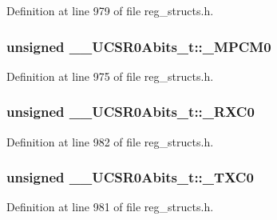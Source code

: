 Definition at line 979 of file reg\+\_\+structs.\+h.

\hypertarget{union_____u_c_s_r0_abits__t_a257c2408b53c4c822a3603e786e2d281}{
\subsubsection[{\+\_\+\+M\+P\+C\+M0}]{\setlength{\rightskip}{0pt plus 5cm}unsigned \+\_\+\+\_\+\+U\+C\+S\+R0\+Abits\+\_\+t\+::\+\_\+\+M\+P\+C\+M0}}\label{union_____u_c_s_r0_abits__t_a257c2408b53c4c822a3603e786e2d281}


Definition at line 975 of file reg\+\_\+structs.\+h.

\hypertarget{union_____u_c_s_r0_abits__t_ae187d165cbd0e5b41cf703c1cf41e0e1}{
\subsubsection[{\+\_\+\+R\+X\+C0}]{\setlength{\rightskip}{0pt plus 5cm}unsigned \+\_\+\+\_\+\+U\+C\+S\+R0\+Abits\+\_\+t\+::\+\_\+\+R\+X\+C0}}\label{union_____u_c_s_r0_abits__t_ae187d165cbd0e5b41cf703c1cf41e0e1}


Definition at line 982 of file reg\+\_\+structs.\+h.

\hypertarget{union_____u_c_s_r0_abits__t_a2d8c629a0fe3d3cc7863a06368d3cc2a}{
\subsubsection[{\+\_\+\+T\+X\+C0}]{\setlength{\rightskip}{0pt plus 5cm}unsigned \+\_\+\+\_\+\+U\+C\+S\+R0\+Abits\+\_\+t\+::\+\_\+\+T\+X\+C0}}\label{union_____u_c_s_r0_abits__t_a2d8c629a0fe3d3cc7863a06368d3cc2a}


Definition at line 981 of file reg\+\_\+structs.\+h.


